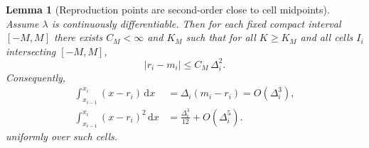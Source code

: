 \documentclass{article}
\newtheorem{lemma}{Lemma}
\newcommand{\abs}[1]{\left\lvert #1 \right\rvert}
\begin{document}
\begin{lemma}[Reproduction points are second-order close to cell midpoints]\label{lem:r_midpoint}
Assume $\lambda$ is continuously differentiable. Then for each fixed compact interval $[-M,M]$ there exists $C_M<\infty$ and $K_M$ such that for all $K\ge K_M$ and all cells $I_i$ intersecting $[-M,M]$,
\begin{equation}\label{eq:r_minus_m}
\abs{r_i-m_i}\le C_M\,\Delta_i^2.
\end{equation}
Consequently,
\begin{equation}\label{eq:first_second_moment_id}
\begin{aligned}
\int_{x_{i-1}}^{x_i} (x-r_i)\, \mathrm{d}x
&= \Delta_i(m_i-r_i)=O(\Delta_i^3), \\
\int_{x_{i-1}}^{x_i} (x-r_i)^2\, \mathrm{d}x
&= \frac{\Delta_i^3}{12}+O(\Delta_i^5).
\end{aligned}
\end{equation}
uniformly over such cells.
\end{lemma}
\end{document}
